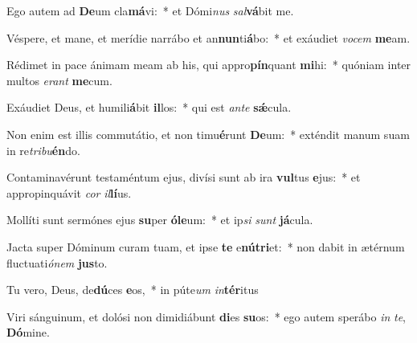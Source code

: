 \item Ego autem ad \textbf{De}um cla\textbf{má}vi:~* et Dómi\textit{nus} \textit{sal}\textbf{vá}bit me.
\item Véspere, et mane, et merídie narrábo et an\textbf{nun}ti\textbf{á}bo:~* et exáudiet \textit{vo}\textit{cem} \textbf{me}am.
\item Rédimet in pace ánimam meam ab his, qui appro\textbf{pín}quant \textbf{mi}hi:~* quóniam inter multos \textit{e}\textit{rant} \textbf{me}cum.
\item Exáudiet Deus, et humili\textbf{á}bit \textbf{il}los:~* qui est \textit{an}\textit{te} \textbf{sǽ}cula.
\item Non enim est illis commutátio, et non timu\textbf{é}runt \textbf{De}um:~* exténdit manum suam in re\textit{tri}\textit{bu}\textbf{én}do.
\item Contaminavérunt testaméntum ejus, divísi sunt ab ira \textbf{vul}tus \textbf{e}jus:~* et appropinquávit \textit{cor} \textit{il}\textbf{lí}us.
\item Mollíti sunt sermónes ejus \textbf{su}per \textbf{ó}\textbf{le}um:~* et ip\textit{si} \textit{sunt} \textbf{já}cula.
\item Jacta super Dóminum curam tuam, et ipse \textbf{te} e\textbf{nú}\textbf{tri}et:~* non dabit in ætérnum fluctuati\textit{ó}\textit{nem} \textbf{jus}to.
\item Tu vero, Deus, de\textbf{dú}ces \textbf{e}os,~* in púte\textit{um} \textit{in}\textbf{tér}itus
\item Viri sánguinum, et dolósi non dimidiábunt \textbf{di}es \textbf{su}os:~* ego autem sperábo \textit{in} \textit{te}, \textbf{Dó}mine.
